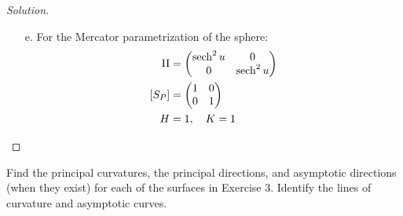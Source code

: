 \documentclass[Shifrin_Solutions_Spring_2018]{subfiles}
\begin{document}
\begin{proof}[Solution]
\begin{itemize}
\item[e.]  For the Mercator parametrization of the sphere:
\begin{align*}
\mathrm{II} & = \begin{pmatrix} \operatorname{\mathrm{sech}}^2 u &  0\\ 0 & \operatorname{\mathrm{sech}}^2 u \end{pmatrix} \\
\left[S_P\right] & = \begin{pmatrix} 1  & 0 \\ 0 & 1 \end{pmatrix} \\
H & = 1, \quad K = 1
\end{align*}

\end{itemize}
\end{proof}



\begin{exercise}
Find the principal curvatures, the principal directions, and asymptotic directions (when they exist) for each of the surfaces in Exercise 3. Identify the lines of curvature and asymptotic curves.
\end{exercise}
\end{document}
